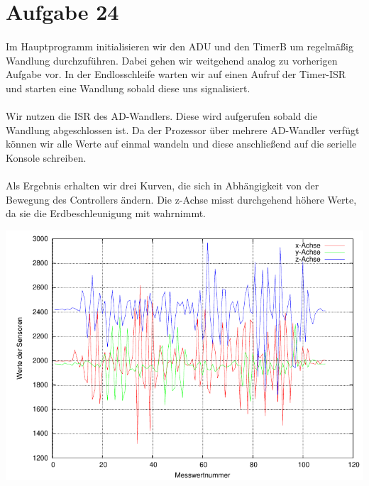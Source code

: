 \section*{Aufgabe 24}

\paragraph*{}
Im Hauptprogramm initialisieren wir den ADU und den TimerB um regelmäßig Wandlung durchzuführen. Dabei gehen wir weitgehend analog zu vorherigen Aufgabe vor. In der Endlosschleife warten wir auf einen Aufruf der Timer-ISR und starten eine Wandlung sobald diese uns signalisiert. 



\paragraph*{}
Wir nutzen die ISR des AD-Wandlers. Diese wird aufgerufen sobald die Wandlung abgeschlossen ist. Da der Prozessor über mehrere AD-Wandler verfügt können wir alle Werte auf einmal wandeln und diese anschließend auf die serielle Konsole schreiben.  



\paragraph*{}
Als Ergebnis erhalten wir drei Kurven, die sich in Abhängigkeit von der Bewegung des Controllers ändern. Die z-Achse misst durchgehend höhere Werte, da sie die Erdbeschleunigung mit wahrnimmt.

\includegraphics[width=\textwidth]{graphs/accel.pdf}

